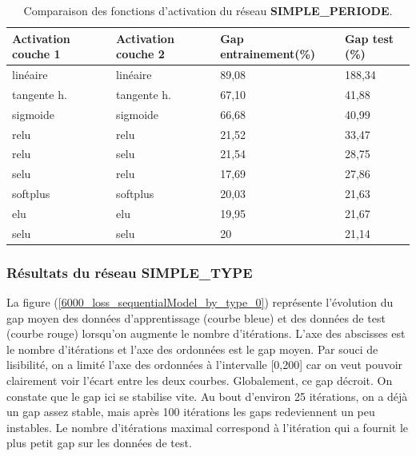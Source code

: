\begin{table}[H]
	\begin{center}
		\begin{tabular}{|m{4cm}|m{4cm}|m{3cm}|m{4cm}|}
\hline
\rowcolor{cyan} Activation couche 1 &Activation couche 2 & Gap entrainement(\%)&Gap test (\%)\\
\hline
linéaire&linéaire &89,08&188,34\\\hline
tangente h.&tangente h.&67,10&41,88\\\hline
sigmoide&sigmoide&66,68 & 40,99\\\hline
relu&relu&21,52&33,47\\\hline
relu&selu&21,54&28,75\\\hline
selu&relu&17,69&27,86\\\hline
softplus&softplus&20,03&21,63\\\hline
elu&elu&19,95&21,67 \\\hline
selu&selu&20&21,14\\\hline

\end{tabular}
\end{center}
\caption[Comparaison des fonctions d'activation du réseau SIMPLE\_PERIODE]{Comparaison des fonctions d'activation du réseau \textbf{SIMPLE\_PERIODE}. \label{comp_act} }
\end{table}




\subsubsection{Résultats du réseau \textbf{SIMPLE\_TYPE}}

La figure (\ref{6000_loss_sequentialModel_by_type_0}) représente l'évolution du gap moyen des données d'apprentissage (courbe bleue) et des données de test (courbe rouge) lorsqu'on augmente le nombre d'itérations. L'axe des abscisses est le nombre d'itérations et l'axe des ordonnées est le gap moyen. Par souci de lisibilité, on a limité l'axe des ordonnées à l'intervalle [0,200] car on veut pouvoir clairement voir l'écart entre les deux courbes. Globalement, ce gap décroit. On constate que le gap ici se stabilise vite. Au bout d'environ 25 itérations, on a déjà un gap assez stable, mais après 100 itérations les gaps redeviennent un peu instables. Le nombre d'itérations maximal correspond à l'itération qui a fournit le plus petit gap sur les données de test.

